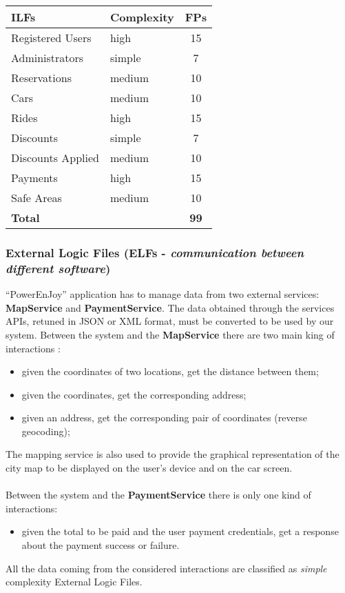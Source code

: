 \begin{center}
	\begin{tabular}{|l|l|c|}
		\hline
		\textbf{ILFs} 	& \textbf{Complexity} 	& \textbf{FPs} \\
		\hline
		Registered Users 	& high 	& 15 \\
		Administrators 	& simple 	& 7 \\
		Reservations 	& medium 	& 10 \\
		Cars 	& medium	& 10 \\
		Rides 	& high 	& 15 \\
		Discounts 	& simple 	& 7 \\
		Discounts Applied 	& medium 	& 10 \\
		Payments 	& high	& 15 \\
		Safe Areas  	& medium	& 10 \\
		\hline \hline
		\textbf{Total} 	& 	& \textbf{99} \\
		\hline
	\end{tabular}
\end{center}

\subsubsection{External Logic Files (ELFs - \textit{communication between different software})}

``PowerEnJoy'' application has to manage data from two external services: \textbf{MapService} and \textbf{PaymentService}.
The data obtained through the services APIs, retuned in JSON or XML format, must be converted to be used by our system.
Between the system and the \textbf{MapService} there are two main king of interactions :
\begin{itemize}
	\item given the coordinates of two locations, get the distance between them;
	\item given the coordinates, get the corresponding address;
	\item given an address, get the corresponding pair of coordinates (reverse geocoding);
\end{itemize}
The mapping service is also used to provide the graphical representation of the city map to be displayed on the user's device and on the car screen. \\
\\
Between the system and the \textbf{PaymentService} there is only one kind of interactions:
\begin{itemize}
	\item given the total to be paid and the user payment credentials, get a response about the payment success or failure.
\end{itemize}
All the data coming from the considered interactions are classified as \textit{simple} complexity External Logic Files. 
	
